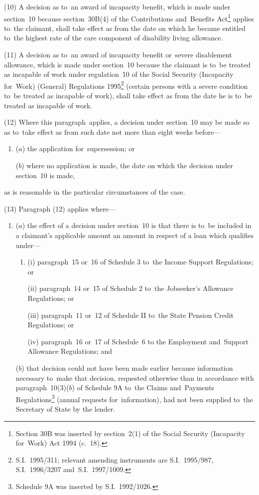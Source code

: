 \documentclass[12pt,a4paper]{article}
\begin{document}
(10) A decision as to~an award of incapacity benefit, which is made under section~10 because section~30B(4) of the Contributions and~Benefits Act\footnote{\frenchspacing Section 30B was inserted by section~2(1) of the Social Security (Incapacity for~Work) Act 1994 (c.~18).} applies to~the claimant, shall take effect as from the date on which he became entitled to~the highest rate of the care component of disability living allowance.

(11) A decision as to~an award of incapacity benefit or~severe disablement allowance, which is made under section~10 because the claimant is to~be treated as incapable of work under regulation~10 of the Social Security (Incapacity for~Work) (General) Regulations 1995\footnote{\frenchspacing S.I.~1995/311; relevant amending instruments are S.I.~1995/987, S.I.~1996/3207 and~S.I.~1997/1009.} (certain persons with a severe condition to~be treated as incapable of work), shall take effect as from the date he is to~be treated as incapable of work.

(12) Where this paragraph~applies, a decision under section~10 may be made so as to~take effect as from such date not more than eight weeks before—
\begin{enumerate}\item[]
($a$) the application for~supersession; or

($b$) where no application is made, the date on which the decision under section~10 is made,
\end{enumerate}
as is reasonable in the particular circumstances of the case.

(13) Paragraph (12) applies where—
\begin{enumerate}\item[]
($a$) the effect of a decision under section~10 is that there is to~be included in a claimant’s applicable amount an amount in respect of a loan which qualifies under—
\begin{enumerate}\item[]
(i) paragraph~15 or~16 of Schedule 3 to~the Income Support Regulations; or

(ii) paragraph~14 or~15 of Schedule 2 to~the Jobseeker’s Allowance Regulations;
or

    (iii) 
    paragraph~11 or~12 of Schedule II to~the State Pension Credit Regulations; 
or  %

(iv) paragraph~16 or~17 of Schedule~6 to the Employment and~Support Allowance Regulations; and
\end{enumerate}

($b$) that decision could not have been made earlier because information necessary to~make that decision, requested otherwise than in accordance with paragraph~10(3)($b$) of Schedule 9A to~the Claims and~Payments Regulations\footnote{\frenchspacing Schedule 9A was inserted by S.I.~1992/1026.} (annual requests for~information), had not been supplied to~the Secretary of State by the lender.
\end{enumerate}
\end{document}
